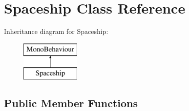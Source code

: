 \hypertarget{class_spaceship}{}\section{Spaceship Class Reference}
\label{class_spaceship}
Inheritance diagram for Spaceship\+:\begin{figure}[H]
\begin{center}
\leavevmode
\includegraphics[height=2.000000cm]{class_spaceship}
\end{center}
\end{figure}
\subsection*{Public Member Functions}
